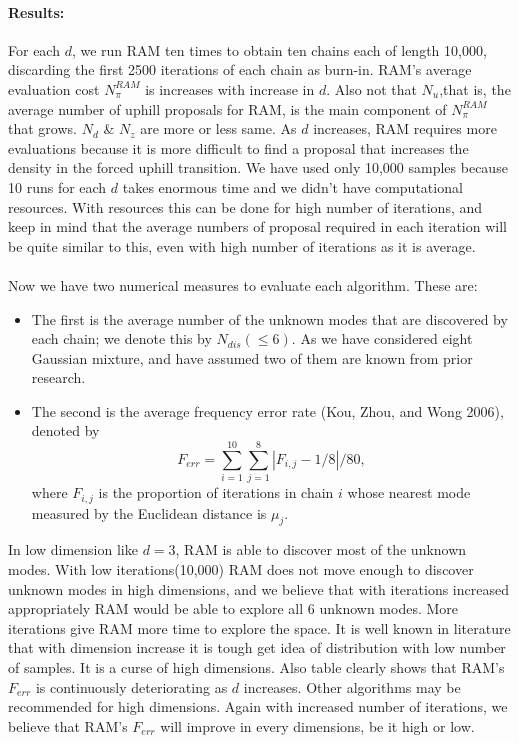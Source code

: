 \documentclass{article}
\begin{document}
\paragraph{Results:}For each $d$, we run RAM ten times to obtain ten chains each
of length 10,000, discarding the first 2500 iterations of each
chain as burn-in. RAM’s average evaluation cost $N_\pi^{RAM}$
 is increases with increase in $d$. Also not that $N_u$,that is, the average number of uphill proposals for RAM, is the main component of $N_\pi^{RAM}$ that grows. $N_d$ \& $N_z$ are more or less same. As $d$ increases, RAM requires more evaluations because it is more difficult to find a proposal that increases the density in the forced uphill transition. We have used only 10,000 samples because 10 runs for each $d$ takes enormous time and we didn't have computational resources. With resources this can be done for high number of iterations, and keep in mind that the average numbers of proposal required in each iteration will be quite similar to this, even with high number of iterations as it is average.
 
 \paragraph{}Now we have two numerical measures to evaluate each algorithm. These are:
 \begin{itemize}
     \item The first is the average number of the unknown modes that are discovered by each chain; we denote this by $N_{dis} (\leq 6)$. As we have considered eight Gaussian mixture, and have assumed two of them are known from prior research.
     \item The second is the average frequency
error rate (Kou, Zhou, and Wong
2006), denoted by $$F_{err} = \sum_{i=1}^{10} \sum_{j=1}^8 |F_{i,j} - 1/8|/80,$$ where $F_{i,j}$
is the proportion of iterations in chain $i$ whose nearest mode
measured by the Euclidean distance is $\mu_j$.
 \end{itemize}
 In low dimension like $d=3$, RAM is able to discover most of the unknown modes. With low iterations(10,000) RAM does not move enough to discover unknown modes in high dimensions, and we believe that with iterations increased appropriately RAM would be able to explore all 6 unknown modes. More iterations give RAM more time to explore the space. It is well known in literature that with dimension increase it is tough get idea of distribution with low number of samples. It is a curse of high dimensions. Also table clearly shows that RAM's $F_{err}$ is continuously deteriorating as $d$ increases. Other algorithms may be recommended for high dimensions. Again with increased number of iterations, we believe that RAM's $F_{err}$ will improve in every dimensions, be it high or low.
\end{document}
